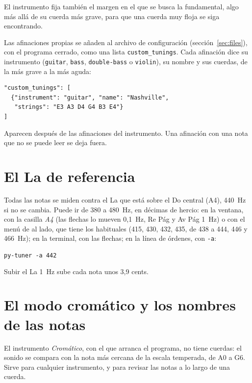 \documentclass[12pt,
              article,
              oneside
              ]{memoir}
\renewenvironment{quote}%
 {\begin{list}{}%
              {\setlength\rightmargin{0pt}%
              \setlength\leftmargin{\parindent}}%
  \item[]\small\ignorespaces}
 {\unskip\end{list}}
\newcommand*{\menu}[1]{\textit{#1}}
\begin{document}
\noindent El instrumento fija también el margen en el que se busca la
fundamental, algo más allá de su cuerda más grave, para que una cuerda muy
floja se siga encontrando.

%
\label{sec:own-tunings}
Las afinaciones propias se añaden al archivo de configuración
(sección~\ref{sec:files}), con el programa cerrado, como una lista
\texttt{custom\_tunings}. Cada afinación dice su instrumento
(\texttt{guitar}, \texttt{bass}, \texttt{double-bass} o \texttt{violin}),
su nombre y sus cuerdas, de la más grave a la más aguda:

\begin{verbatim}
"custom_tunings": [
  {"instrument": "guitar", "name": "Nashville",
   "strings": "E3 A3 D4 G4 B3 E4"}
]
\end{verbatim}

\noindent Aparecen después de las afinaciones del instrumento. Una
afinación con una nota que no se puede leer se deja fuera.

\section{El La de referencia}
\label{sec:a4}

%
Todas las notas se miden contra el La que está sobre el Do central (A4),
440~Hz si no se cambia. Puede ir de 380 a 480~Hz, en décimas de hercio: en
la ventana, con la casilla \menu{A4} (las flechas lo mueven 0,1~Hz, Re Pág
y Av Pág 1~Hz) o con el menú de al lado, que tiene los habituales (415,
430, 432, 435, de 438 a 444, 446 y 466~Hz); en la terminal, con las
flechas; en la línea de órdenes, con \texttt{-a}:

\begin{quote}
\texttt{py-tuner -a 442}
\end{quote}

\noindent Subir el La 1~Hz sube cada nota unos 3,9 cents.

\section{El modo cromático y los nombres de las notas}
\label{sec:chromatic}

%
El instrumento \menu{Cromático}, con el que arranca el programa, no tiene
cuerdas: el sonido se compara con la nota más cercana de la escala
temperada, de A0 a G6. Sirve para
cualquier instrumento, y para revisar las notas a lo largo de una cuerda.
\end{document}
